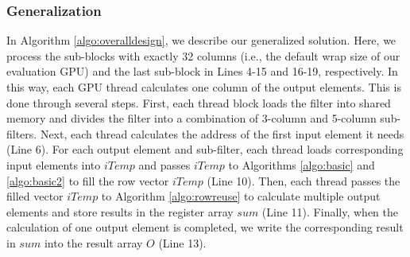 \subsubsection{Generalization} In Algorithm \ref{algo:overalldesign}, we describe our generalized solution. Here, we process the sub-blocks
with exactly 32 columns (i.e., the default wrap size of our evaluation GPU) and the last sub-block in Lines 4-15 and 16-19, respectively.
In this way, each GPU thread calculates one column of the output elements. This is done through several steps. First, each thread block
loads the filter into shared memory and divides the filter into a combination of 3-column and 5-column sub-filters. Next, each thread
calculates the address of the first input element it needs (Line 6). For each output element and sub-filter, each thread loads
corresponding input elements into $iTemp$ and passes $iTemp$ to Algorithms \ref{algo:basic} and \ref{algo:basic2} to fill the row vector $iTemp$
(Line 10). Then, each thread passes the filled vector $iTemp$ to Algorithm \ref{algo:rowreuse} to calculate multiple output elements and
store results in the register array $sum$ (Line 11). Finally, when the calculation of one output element is completed, we write the
corresponding result in $sum$ into the result array $O$ (Line 13).
